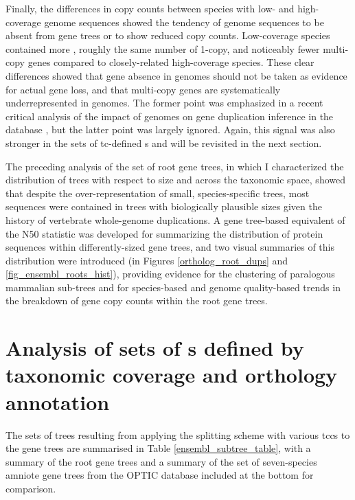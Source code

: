 Finally, the differences in copy counts between species with low- and
high-coverage genome sequences showed the tendency of \lcv genome
sequences to be absent from gene trees or to show reduced copy
counts. Low-coverage species contained more \zcop, roughly the same
number of 1-copy, and noticeably fewer multi-copy genes compared to
closely-related high-coverage species. These clear differences showed
that gene absence in \lcv genomes should not be taken as evidence for
actual gene loss, and that multi-copy genes are systematically
underrepresented in \lcv genomes. The former point was emphasized in a
recent critical analysis of the impact of \lcv genomes on gene
duplication inference in the \cmp database \citep{Milinkovitch2010},
but the latter point was largely ignored. Again, this signal was also
stronger in the sets of \ac{tc}-defined \mammln \subtr{}s and will be
revisited in the next section.

The preceding analysis of the set of root \cmp gene trees, in which I
characterized the distribution of trees with respect to size and
across the taxonomic space, showed that despite the
over-representation of small, species-specific trees, most sequences
were contained in trees with biologically plausible sizes given the
history of vertebrate whole-genome duplications. A gene tree-based
equivalent of the N50 statistic was developed for summarizing the
distribution of protein sequences within differently-sized gene trees,
and two visual summaries of this distribution were introduced (in
Figures \ref{ortholog_root_dups} and \ref{fig_ensembl_roots_hist}),
providing evidence for the clustering of paralogous mammalian
sub-trees and for species-based and genome quality-based trends in the
breakdown of gene copy counts within the root \cmp gene trees.

\section{Analysis of sets of \subtr{}s defined by taxonomic coverage and orthology annotation}
\label{section_analysis_sets_subtrees}

The sets of trees resulting from applying the \subtr splitting scheme
with various \acp{tcc} to the \cmp gene trees are summarised in Table
\ref{ensembl_subtree_table}, with a summary of the root \cmp gene
trees and a summary of the set of seven-species amniote gene trees
from the OPTIC database \citep{Heger2008} included at the bottom for
comparison.


